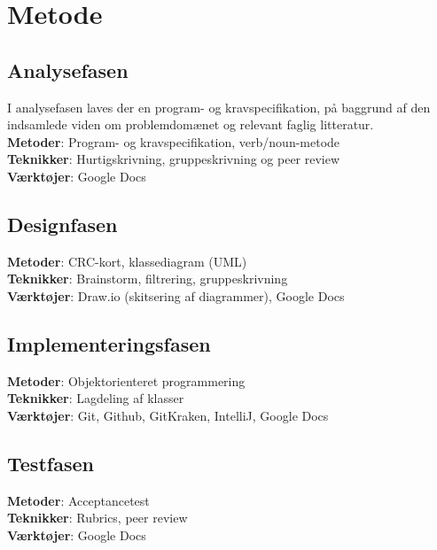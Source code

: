 \documentclass[a4paper,12pt]{report}
\begin{document}
\section{Metode}
\subsection{Analysefasen}
I analysefasen laves der en program- og kravspecifikation, på baggrund af den indsamlede viden om problemdomænet og relevant faglig litteratur. \\
\textbf{Metoder}: Program- og kravspecifikation, verb/noun-metode \\
\textbf{Teknikker}: Hurtigskrivning, gruppeskrivning og peer review \\
\textbf{Værktøjer}: Google Docs

\subsection{Designfasen}
\textbf{Metoder}: CRC-kort, klassediagram (UML) \\
\textbf{Teknikker}: Brainstorm, filtrering, gruppeskrivning \\
\textbf{Værktøjer}: Draw.io (skitsering af diagrammer), Google Docs

\subsection{Implementeringsfasen}
\textbf{Metoder}: Objektorienteret programmering \\
\textbf{Teknikker}: Lagdeling af klasser \\
\textbf{Værktøjer}: Git, Github, GitKraken, IntelliJ, Google Docs

\subsection{Testfasen}
\textbf{Metoder}: Acceptancetest \\
\textbf{Teknikker}: Rubrics, peer review \\
\textbf{Værktøjer}: Google Docs
\end{document}

